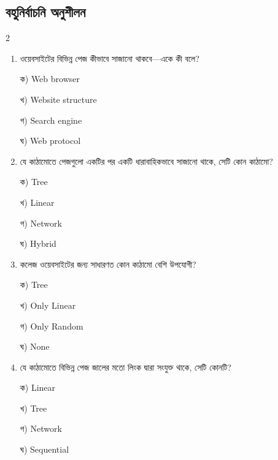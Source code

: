 \subsection{বহুনির্বাচনি অনুশীলন}

\begin{multicols}{2}
\begin{enumerate}[leftmargin=*,itemsep=5pt]
\item \begin{minipage}[t]{\linewidth}\vspace{0pt}
ওয়েবসাইটের বিভিন্ন পেজ কীভাবে সাজানো থাকবে—একে কী বলে?
\par ক) Web browser
\par খ) Website structure
\par গ) Search engine
\par ঘ) Web protocol\\
\end{minipage}

\item \begin{minipage}[t]{\linewidth}\vspace{0pt}
যে কাঠামোতে পেজগুলো একটির পর একটি ধারাবাহিকভাবে সাজানো থাকে, সেটি কোন কাঠামো?
\par ক) Tree
\par খ) Linear
\par গ) Network
\par ঘ) Hybrid\\
\end{minipage}

\item \begin{minipage}[t]{\linewidth}\vspace{0pt}
কলেজ ওয়েবসাইটের জন্য সাধারণত কোন কাঠামো বেশি উপযোগী?
\par ক) Tree
\par খ) Only Linear
\par গ) Only Random
\par ঘ) None\\
\end{minipage}

\item \begin{minipage}[t]{\linewidth}\vspace{0pt}
যে কাঠামোতে বিভিন্ন পেজ জালের মতো লিংক দ্বারা সংযুক্ত থাকে, সেটি কোনটি?
\par ক) Linear
\par খ) Tree
\par গ) Network
\par ঘ) Sequential\\
\end{minipage}


\end{enumerate}
\end{multicols}

